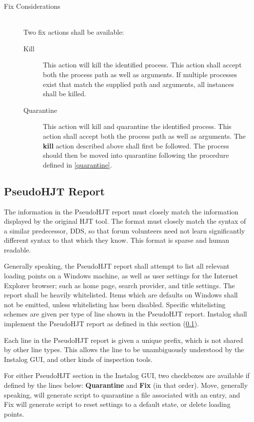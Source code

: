 \begin{description}
\begin{itemize}
\end{itemize}
\item[Fix Considerations] \hfill \\
Two fix actions shall be available:
\begin{description}
\item[Kill] This action will kill the identified process.  This action shall
accept both the process path as well as arguments.  If multiple processes exist
that match the supplied path and arguments, all instances shall be killed. 
\item[Quarantine]  This action will kill and quarantine the identified
process.  This action shall accept both the process path as well as arguments. 
The \textbf{kill} action described above shall first be followed.  The process
should then be moved into quarantine following the procedure defined in
\ref{quarantine}.  
\end{description}
\end{description}

\subsection{PseudoHJT Report} \label{hjtgeneral}
The information in the PseudoHJT report must closely match the information
displayed by the original HJT tool. The format must closely match the syntax of
a similar predecessor, DDS, so that forum volunteers need not learn
significantly different syntax to that which they know. This format is
sparse and human readable. 

Generally speaking, the PseudoHJT report shall attempt to list all relevant
loading points on a Windows machine, as well as user settings for the Internet
Explorer browser; such as home page, search provider, and title settings. The
report shall be heavily whitelisted. Items which are defaults on Windows shall
not be emitted, unless whitelisting has been disabled. Specific whitelisting
schemes are given per type of line shown in the PseudoHJT report. Instalog shall
implement the PseudoHJT report as defined in this section (\ref{hjtgeneral}).

Each line in the PseudoHJT report is given a unique prefix, which is not shared
by other line types. This allows the line to be unambiguously understood by the
Instalog GUI, and other kinds of inspection tools.

For either PseudoHJT section in the Instalog GUI, two checkboxes are available
if defined by the lines below: \textbf{Quarantine} and \textbf{Fix} (in that
order).  Move, generally speaking, will generate script to quarantine a file
associated with an entry, and Fix will generate script to reset settings to a
default state, or delete loading points.

